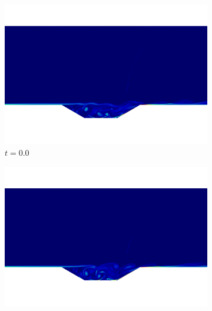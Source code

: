 %

\begin{figure}
\begin{center}
\begin{subfigure}[t]{0.49\textwidth}
\includegraphics[trim={15cm 7cm 16cm 20cm},clip,width=1.0\linewidth]{figs/cavity_new/vort_anim0000.png}
\caption{$t=0.0$}
\end{subfigure}
\begin{subfigure}[t]{0.49\textwidth}
\includegraphics[trim={15cm 7cm 16cm 20cm},clip,width=1.0\linewidth]{figs/cavity_new/vort_anim0030.png}

\end{subfigure}
\end{center}
\end{figure}
